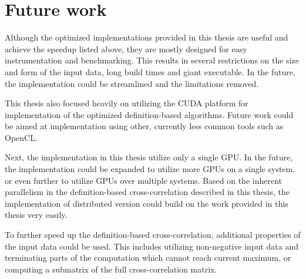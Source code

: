 \section{Future work}
Although the optimized implementations provided in this thesis are useful and achieve the speedup listed above, they are mostly designed for easy instrumentation and benchmarking. This results in several restrictions on the size and form of the input data, long build times and giant executable. In the future, the implementation could be streamlined and the limitations removed.

This thesis also focused heavily on utilizing the CUDA platform for implementation of the optimized definition-based algorithms. Future work could be aimed at implementation using other, currently less common tools such as OpenCL. 

Next, the implementation in this thesis utilize only a single GPU. In the future, the implementation could be expanded to utilize more GPUs on a single system, or even further to utilize GPUs over multiple systems. Based on the inherent parallelism in the definition-based cross-correlation described in this thesis, the  implementation of distributed version could build on the work provided in this thesis very easily.

To further speed up the definition-based cross-correlation, additional properties of the input data could be used. This includes utilizing non-negative input data and terminating parts of the computation which cannot reach current maximum, or computing a submatrix of the full cross-correlation matrix.
